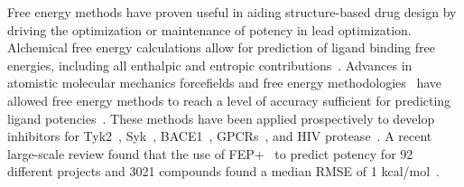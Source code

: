 \documentclass[9pt,lineno]{elife-modified} %
\begin{document}
%
%
%
%
Free energy methods have proven useful in aiding structure-based drug design by driving the optimization or maintenance of potency in lead optimization. Alchemical free energy calculations allow for prediction of ligand binding free energies, including all enthalpic and entropic contributions~\citep{Chodera2011-jn}. Advances in atomistic molecular mechanics forcefields and free energy methodologies~\citep{Huang:J.Comput.Chem.:2013,Maier:J.Chem.TheoryComput.:2015,Harder:J.Chem.TheoryComput.:2016,Cournia:2017ip} have allowed free energy methods to reach a level of accuracy  sufficient for predicting ligand potencies~\citep{BROWN2009420}. These methods have been applied prospectively to develop inhibitors for Tyk2~\citep{Abel2017-gw}, Syk~\citep{Lovering:2016fg}, BACE1~\citep{Ciordia:2016dn}, GPCRs~\citep{Lenselink:2016ip}, and HIV protease~\citep{Jorgensen:2016dv}. A recent large-scale review found that the use of FEP+~\citep{Wang:J.Am.Chem.Soc.:2015} to predict potency for 92 different projects and 3021 compounds found a median RMSE of 1 kcal/mol~\citep{Abel:2017jt}. 
\end{document}
